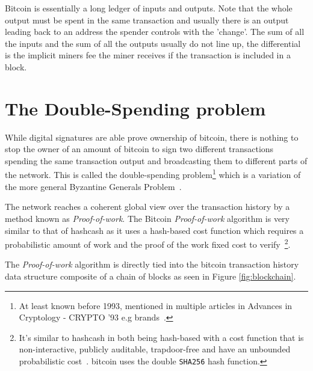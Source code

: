 Bitcoin is essentially a long ledger of inputs and outputs. Note that the whole output must be spent in the same transaction and usually there is an output leading back to an address the spender controls with the 'change'. The sum of all the inputs and the sum of all the outputs usually do not line up, the differential is the implicit miners fee the miner receives if the transaction is included in a block. 

\vspace*{-0.5cm}

\section{The Double-Spending problem}

While digital signatures are able prove ownership of bitcoin, there is nothing to stop the owner of an amount of bitcoin to sign two different transactions spending the same transaction output and broadcasting them to different parts of the network. This is called the double-spending problem\footnote{At least known before 1993, mentioned in multiple articles in Advances in Cryptology - CRYPTO '93 e.g brands~\cite{crypto-1993-1108}. } which is a variation of the more general Byzantine Generals Problem~\cite{lamport:shostak:byzantine:generals}.


The network reaches a coherent global view over the transaction history by a method known as \textit{Proof-of-work}. The Bitcoin \textit{Proof-of-work} algorithm is very similar to that of hashcash as it uses a hash-based cost function which requires a probabilistic amount of work and the proof of the work fixed cost to verify~\cite{back:hashcash}\footnote{It's similar to hashcash in both being \gls{hash}-based with a cost function that is non-interactive, publicly auditable, trapdoor-free and have an unbounded probabilistic cost~\cite{back:hashcash}.
\gls{bitcoin} uses the double \texttt{SHA256} hash function.}.

The \textit{Proof-of-work} algorithm is directly tied into the bitcoin transaction history data structure composite of a chain of blocks as seen in Figure \ref{fig:blockchain}.

